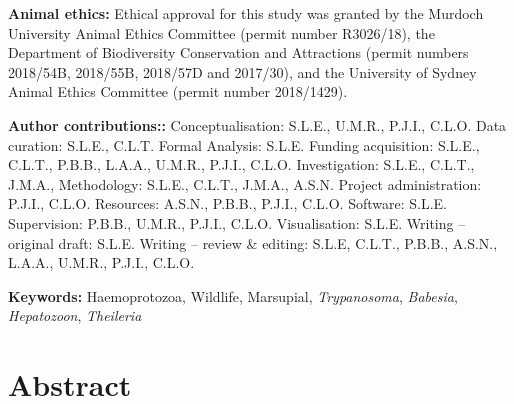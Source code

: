 \documentclass[a4paper, nobind]{templates/ociamthesis}
\begin{document}
\vspace{5mm}

\textbf{Animal ethics:}
Ethical approval for this study was granted by the Murdoch University Animal Ethics Committee (permit number R3026/18), the Department of Biodiversity Conservation and Attractions (permit numbers 2018/54B, 2018/55B, 2018/57D and 2017/30), and the University of Sydney Animal Ethics Committee (permit number 2018/1429).

\vspace{5mm}

\textbf{Author contributions::}
Conceptualisation: S.L.E., U.M.R., P.J.I., C.L.O.
Data curation: S.L.E., C.L.T.
Formal Analysis: S.L.E.
Funding acquisition: S.L.E., C.L.T., P.B.B., L.A.A., U.M.R., P.J.I., C.L.O.
Investigation: S.L.E., C.L.T., J.M.A.,
Methodology: S.L.E., C.L.T., J.M.A., A.S.N.
Project administration: P.J.I., C.L.O.
Resources: A.S.N., P.B.B., P.J.I., C.L.O.
Software: S.L.E.
Supervision: P.B.B., U.M.R., P.J.I., C.L.O.
Visualisation: S.L.E.
Writing -- original draft: S.L.E.
Writing -- review \& editing: S.L.E, C.L.T., P.B.B., A.S.N., L.A.A., U.M.R., P.J.I., C.L.O.

\vspace{5mm}

\textbf{Keywords:} Haemoprotozoa, Wildlife, Marsupial, \emph{Trypanosoma}, \emph{Babesia}, \emph{Hepatozoon}, \emph{Theileria}

\newpage

\hypertarget{abstract-2}{%
\section{Abstract}\label{abstract-2}}
\end{document}
